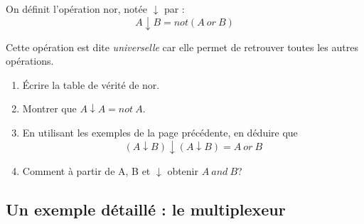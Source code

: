 \begin{exercice}[]
    On définit l'opération \og nor\fg{}, notée $\downarrow$ par : $$A\downarrow B = not(A\ or\ B)$$

    Cette opération est dite \textit{universelle} car elle permet de retrouver toutes les autres opérations.

    \begin{enumerate}[\bfseries 1.]
        \item 	\'Ecrire la table de vérité de nor.
        \item 	Montrer que $A\downarrow A = not\ A$.
        \item 	En utilisant les exemples de la page précédente, en déduire que $$(A\downarrow B)\downarrow(A\downarrow B) = A\ or\ B$$
        \item 	Comment à partir de A, B et $\downarrow$ obtenir $A\ and\ B$?
    \end{enumerate}
\end{exercice}

\subsection{Un exemple détaillé : le multiplexeur}

